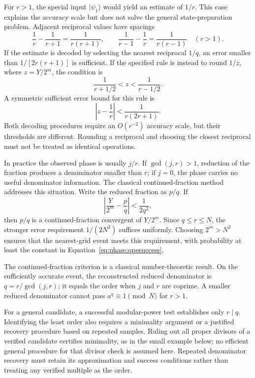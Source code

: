 \documentclass[11pt,oneside,openany]{book}
\providecommand{\ket}{}
\renewcommand{\ket}[1]{\lvert #1\rangle}
\theoremstyle{definition}
\begin{document}
For $r>1$, the special input $\ket{\psi_1}$ would yield an estimate of $1/r$. This case explains the accuracy scale but does not solve the general state-preparation problem. Adjacent reciprocal values have spacings
\begin{equation}
 \frac1r-\frac1{r+1}=\frac1{r(r+1)},\qquad
 \frac1{r-1}-\frac1r=\frac1{r(r-1)}\quad(r>1).
\end{equation}
If the estimate is decoded by selecting the nearest reciprocal $1/q$, an error smaller than $1/[2r(r+1)]$ is sufficient. If the specified rule is instead to round $1/z$, where $z=Y/2^m$, the condition is
\begin{equation}
 \frac1{r+1/2}<z<\frac1{r-1/2}.
\end{equation}
A symmetric sufficient error bound for this rule is
\begin{equation}
 \left|z-\frac1r\right|<\frac1{r(2r+1)}.
 \label{eq:phase:roundinverse}
\end{equation}
Both decoding procedures require an $O(r^{-2})$ accuracy scale, but their thresholds are different. Rounding a reciprocal and choosing the closest reciprocal must not be treated as identical operations.

In practice the observed phase is usually $j/r$. If $\gcd(j,r)>1$, reduction of the fraction produces a denominator smaller than $r$; if $j=0$, the phase carries no useful denominator information. The classical continued-fraction method addresses this situation\cite{NC2010,Shor1997}. Write the reduced fraction as $p/q$. If
\begin{equation}
 \left|\frac{Y}{2^m}-\frac pq\right|<\frac1{2q^2},
 \label{eq:phase:cfcriterion}
\end{equation}
then $p/q$ is a continued-fraction convergent of $Y/2^m$. Since $q\le r\le N$, the stronger error requirement $1/(2N^2)$ suffices uniformly. Choosing $2^m>N^2$ ensures that the nearest-grid event meets this requirement, with probability at least the constant in Equation~\eqref{eq:phase:qpesuccess}.

The continued-fraction criterion is a classical number-theoretic result. On the sufficiently accurate event, the reconstructed reduced denominator is $q=r/\gcd(j,r)$; it equals the order when $j$ and $r$ are coprime. A smaller reduced denominator cannot pass $a^q\equiv1\pmod N$ for $r>1$.

For a general candidate, a successful modular-power test establishes only $r\mid q$. Identifying the least order also requires a minimality argument or a justified recovery procedure based on repeated samples. Ruling out all proper divisors of a verified candidate certifies minimality, as in the small example below; no efficient general procedure for that divisor check is assumed here. Repeated denominator recovery must retain its approximation and success conditions rather than treating any verified multiple as the order.
\end{document}
